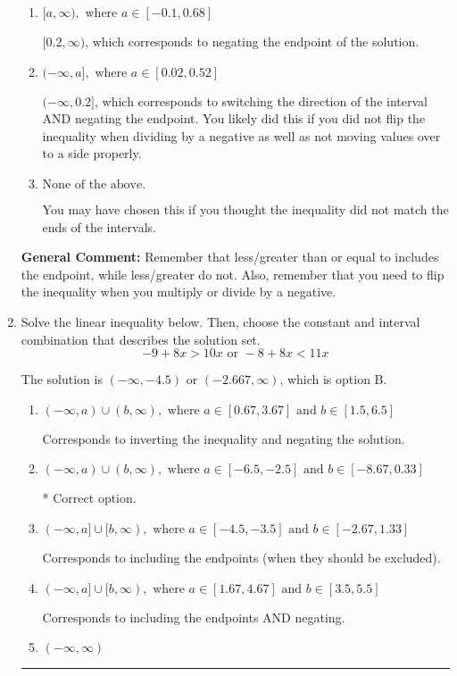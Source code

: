 \documentclass{extbook}[14pt]
\newcommand{\litem}[1]{\item #1

\rule{\textwidth}{0.4pt}}
\begin{document}
\begin{enumerate}
{\begin{enumerate}[label=\Alph*.]
 $(-\infty, -0.2]$, which corresponds to switching the direction of the interval. You likely did this if you did not flip the inequality when dividing by a negative!
\item \( [a, \infty), \text{ where } a \in [-0.1, 0.68] \)

 $[0.2, \infty)$, which corresponds to negating the endpoint of the solution.
\item \( (-\infty, a], \text{ where } a \in [0.02, 0.52] \)

 $(-\infty, 0.2]$, which corresponds to switching the direction of the interval AND negating the endpoint. You likely did this if you did not flip the inequality when dividing by a negative as well as not moving values over to a side properly.
\item \( \text{None of the above}. \)

You may have chosen this if you thought the inequality did not match the ends of the intervals.
\end{enumerate}

\textbf{General Comment:} Remember that less/greater than or equal to includes the endpoint, while less/greater do not. Also, remember that you need to flip the inequality when you multiply or divide by a negative.
}
\litem{
Solve the linear inequality below. Then, choose the constant and interval combination that describes the solution set.
\[ -9 + 8 x > 10 x \text{ or } -8 + 8 x < 11 x \]

The solution is \( (-\infty, -4.5) \text{ or } (-2.667, \infty) \), which is option B.\begin{enumerate}[label=\Alph*.]
\item \( (-\infty, a) \cup (b, \infty), \text{ where } a \in [0.67, 3.67] \text{ and } b \in [1.5, 6.5] \)

Corresponds to inverting the inequality and negating the solution.
\item \( (-\infty, a) \cup (b, \infty), \text{ where } a \in [-6.5, -2.5] \text{ and } b \in [-8.67, 0.33] \)

 * Correct option.
\item \( (-\infty, a] \cup [b, \infty), \text{ where } a \in [-4.5, -3.5] \text{ and } b \in [-2.67, 1.33] \)

Corresponds to including the endpoints (when they should be excluded).
\item \( (-\infty, a] \cup [b, \infty), \text{ where } a \in [1.67, 4.67] \text{ and } b \in [3.5, 5.5] \)

Corresponds to including the endpoints AND negating.
\item \( (-\infty, \infty) \)


\end{enumerate}}
\end{enumerate}
\end{document}
